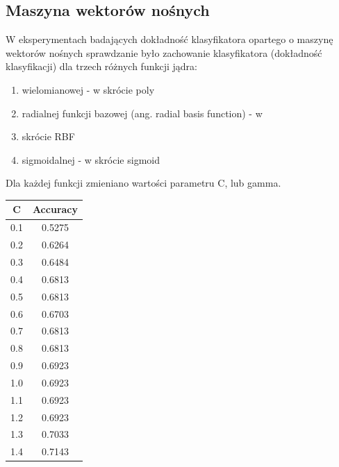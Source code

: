 \documentclass{classrep}
\begin{document}
{        \subsection{Maszyna wektorów nośnych}
        \label{svm_results} {
            W eksperymentach badających dokładność klasyfikatora opartego o maszynę
            wektorów nośnych sprawdzanie było zachowanie klasyfikatora (dokładność
            klasyfikacji) dla trzech różnych funkcji jądra:
            \begin{enumerate}
                \item wielomianowej - w skrócie poly
                \item radialnej funkcji bazowej (ang. radial basis function) - w
                \item skrócie RBF
                \item sigmoidalnej - w skrócie sigmoid
            \end{enumerate}
            Dla każdej funkcji zmieniano wartości parametru C, lub gamma.
            \begin{table}[!htbp]
                \begin{minipage}{.35\textwidth}
                    \centering
                    \begin{tabular}{|c|c|}
                        \hline
                        C & Accuracy \\ \hline
                        0.1 & 0.5275 \\ \hline
                        0.2 & 0.6264 \\ \hline
                        0.3 & 0.6484 \\ \hline
                        0.4 & 0.6813 \\ \hline
                        0.5 & 0.6813 \\ \hline
                        0.6 & 0.6703 \\ \hline
                        0.7 & 0.6813 \\ \hline
                        0.8 & 0.6813 \\ \hline
                        0.9 & 0.6923 \\ \hline
                        1.0 & 0.6923 \\ \hline
                        1.1 & 0.6923 \\ \hline
                        1.2 & 0.6923 \\ \hline
                        1.3 & 0.7033 \\ \hline
                        1.4 & 0.7143 \\ \hline

\end{tabular}
\end{minipage}
\end{table}}}
\end{document}
